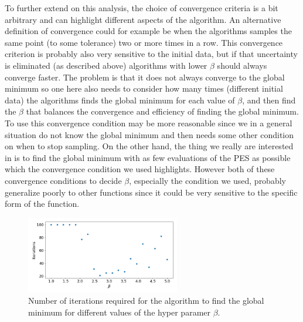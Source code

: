 \documentclass[11pt,a4paper]{article}
\begin{document}
To further extend on this analysis, the choice of convergence criteria is a bit arbitrary and can highlight different aspects of the algorithm. An alternative definition of convergence could for example be when the algorithms samples the same point (to some tolerance) two or more times in a row. This convergence criterion is probably also very sensitive to the initial data, but if that uncertainty is eliminated (as described above) algorithms with lower $\beta$ should always converge faster. The problem is that it does not always converge to the global minimum so one here also needs to consider how many times (different initial data) the algorithms finds the global minimum for each value of $\beta$, and then find the $\beta$ that balances the convergence and efficiency of finding the global minimum. To use this convergence condition may be more reasonable since we in a general situation do not know the global minimum and then needs some other condition on when to stop sampling. On the other hand, the thing we really are interested in is to find the global minimum with as few evaluations of the PES as possible which the convergence condition we used highlights. However both of these convergence conditions to decide $\beta$, especially the condition we used, probably generalize poorly to other functions since it could be very sensitive to the specific form of the function.

\begin{figure}[ht]
    \centering
    \includegraphics[width = 0.6\textwidth]{figures/task3_iter.png}
    \caption{Number of iterations required for the algorithm to find the global minimum for different values of the hyper paramer $\beta$.}
    \label{fig:task3_iter}
\end{figure}
\end{document}
